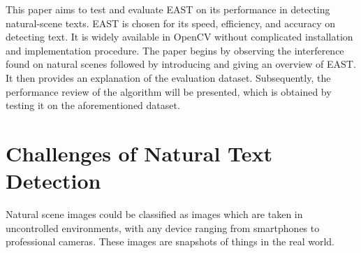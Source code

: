 \documentclass[10pt, a4paper]{article}
\begin{document}
This paper aims to test and evaluate EAST on its performance in detecting natural-scene texts. 
EAST is chosen for its speed, efficiency, and accuracy on detecting text. It is widely available in OpenCV without complicated installation and implementation procedure.
The paper begins by observing the interference found on natural scenes followed by introducing and giving an overview of EAST.
It then provides an explanation of the evaluation dataset. Subsequently, the performance review of the algorithm will be presented, which is obtained by testing it on the aforementioned dataset.

\section{Challenges of Natural Text Detection} %
\label{sec:challenges}
Natural scene images could be classified as images which are taken in uncontrolled environments, with any device ranging from smartphones to professional cameras. These images are snapshots of things in the real world.
\end{document}
